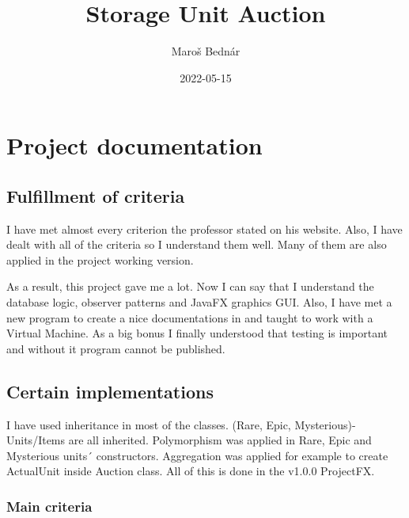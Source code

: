 \documentclass[
]{report}
\title{Storage Unit Auction}
\author{Maroš Bednár}
\date{2022-05-15}
\begin{document}
\maketitle

{
\setcounter{tocdepth}{1}
\tableofcontents
}
\hypertarget{project-documentation}{%
\chapter{Project documentation}\label{project-documentation}}

\hypertarget{fulfillment-of-criteria}{%
\section{Fulfillment of criteria}\label{fulfillment-of-criteria}}

I have met almost every criterion the professor stated on his website. Also, I have dealt with all of the criteria so I understand them well. Many of them are also applied in the project working version.

As a result, this project gave me a lot. Now I can say that I understand the database logic, observer patterns and JavaFX graphics GUI. Also, I have met a new program to create a nice documentations in and taught to work with a Virtual Machine. As a big bonus I finally understood that testing is important and without it program cannot be published.

\hypertarget{certain-implementations}{%
\section{Certain implementations}\label{certain-implementations}}

I have used inheritance in most of the classes. (Rare, Epic, Mysterious)-Units/Items are all inherited. Polymorphism was applied in Rare, Epic and Mysterious units´ constructors. Aggregation was applied for example to create ActualUnit inside Auction class. All of this is done in the v1.0.0 ProjectFX.

\hypertarget{main-criteria}{%
\subsection{Main criteria}\label{main-criteria}}
\end{document}
